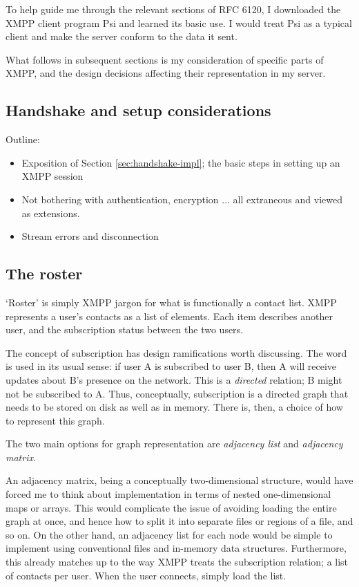 To help guide me through the relevant sections of RFC 6120, I downloaded the XMPP client program Psi\cite{Psi-IM} and learned its basic use. I would treat Psi as a typical client and make the server conform to the data it sent.

What follows in subsequent sections is my consideration of specific parts of XMPP, and the design decisions affecting their representation in my server.

\subsection{Handshake and setup considerations}
Outline:
\begin{itemize}
  \item Exposition of Section \ref{sec:handshake-impl}; the basic steps in setting up an XMPP session
  \item Not bothering with authentication, encryption ... all extraneous and viewed as extensions.
  \item Stream errors and disconnection
\end{itemize}

\subsection{The roster}
`Roster' is simply XMPP jargon for what is functionally a contact list. XMPP represents a user's contacts as a list of  elements. Each item describes another user, and the subscription status between the two users.

The concept of subscription has design ramifications worth discussing. The word is used in its usual sense: if user A is subscribed to user B, then A will receive updates about B's presence on the network. This is a \emph{directed} relation; B might not be subscribed to A. Thus, conceptually, subscription is a directed graph that needs to be stored on disk as well as in memory. There is, then, a choice of how to represent this graph.

The two main options for graph representation are \emph{adjacency list} and \emph{adjacency matrix}.

An adjacency matrix, being a conceptually two-dimensional structure, would have forced me to think about implementation in terms of nested one-dimensional maps or arrays. This would complicate the issue of avoiding loading the entire graph at once, and hence how to split it into separate files or regions of a file, and so on. On the other hand, an adjacency list for each node would be simple to implement using conventional files and in-memory data structures. Furthermore, this already matches up to the way XMPP treats the subscription relation; a list of contacts per user. When the user connects, simply load the list.


